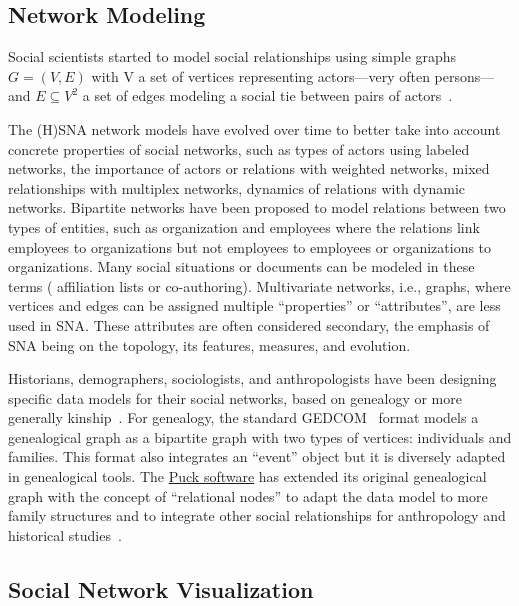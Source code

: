 \subsection{Network Modeling}

Social scientists started to model social relationships using simple graphs $G= (V, E)$ with V a set of vertices representing actors---very often persons---and $E \subseteq V^2$ a set of edges modeling a social tie between pairs of actors~\cite{freeman_development_2004}.

The (H)SNA network models have evolved over time to better take into account concrete properties of social networks, such as types of actors using labeled networks, the importance of actors or relations with weighted networks, mixed relationships with multiplex networks, dynamics of relations with dynamic networks.
Bipartite networks have been proposed to model relations between two types of entities, such as organization and employees where the relations link employees to organizations but not employees to employees or organizations to organizations. Many social situations or documents can be modeled in these terms (%
affiliation lists or co-authoring).
Multivariate networks, i.e.,  graphs, where vertices and edges can be assigned multiple ``properties'' or ``attributes'', are less used in SNA\@. These attributes are often considered secondary, the emphasis of SNA being on the topology, its features, measures, and evolution.

Historians, demographers, sociologists, and anthropologists have been designing specific data models for their social networks, based on genealogy or more generally kinship~\cite{hamberger:halshs-00658667}. For genealogy, the standard GEDCOM~\cite{gedcom} format models a genealogical graph as a bipartite graph with two types of vertices: individuals and families. This format also integrates an ``event'' object but it is diversely adapted in genealogical tools. The \href{https://www.kintip.net/}{Puck software} has extended its original genealogical graph with the concept of ``relational nodes'' to adapt the data model to more family structures and to integrate other social relationships for anthropology and historical studies~\cite{hamberger_scanning_2014}.

\subsection{Social Network Visualization}

